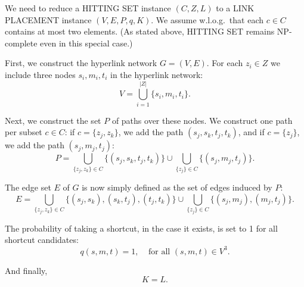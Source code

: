 \documentclass[11pt,letterpaper]{article}
\newcommand{\LP}{LINK PLACEMENT}
\newcommand{\HS}{HITTING SET}
\begin{document}
We need to reduce a \HS{} instance $(C,Z,L)$ to a \LP{} instance $(V,E,P,q,K)$.
We assume w.l.o.g.\ that each $c \in C$ contains at most two elements.
(As stated above, \HS{} remains NP-complete even in this special case.)

First, we construct the hyperlink network $G=(V,E)$.
For each $z_i \in Z$ we include three nodes $s_i,m_i,t_i$ in the hyperlink network:
\begin{equation}
V=\bigcup_{i=1}^{|Z|} \{s_i, m_i, t_i\}.
\end{equation}

Next, we construct the set $P$ of paths over these nodes. We construct one path per subset $c \in C$:
if $c=\{z_j,z_k\}$, we add the path $(s_j,s_k,t_j,t_k)$, and if $c=\{z_j\}$, we add the path $(s_j,m_j,t_j)$:
\begin{equation}
P = \bigcup_{\{z_j,z_k\} \in C} \{(s_j, s_k, t_j, t_k)\} \cup \bigcup_{\{z_j\} \in C} \{(s_j, m_j, t_j)\}.
\end{equation}

The edge set $E$ of $G$ is now simply defined as the set of edges induced by $P$:
\begin{equation}
E = \bigcup_{\{z_j,z_k\} \in C} \{(s_j,s_k), (s_k,t_j), (t_j,t_k)\} \cup \bigcup_{\{z_j\} \in C} \{(s_j,m_j), (m_j,t_j)\}.
\end{equation}

The probability of taking a shortcut, in the case it exists, is set to 1 for all shortcut candidates:
\begin{equation}
q(s,m,t) = 1, \;\;\;\; \mbox{for all $(s,m,t) \in V^3$}.
\end{equation}

And finally,
\begin{equation}
K=L.
\end{equation}
\end{document}
